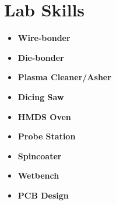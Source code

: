 \documentclass[]{chandan-cv}
\begin{document}
\begin{minipage}[t]{0.23\textwidth}

\section{Lab Skills}
	\begin{itemize}
		\setlength\itemsep{-0.2em}
		\item \textbf{Wire-bonder}
		\item \textbf{Die-bonder}
		\item \textbf{Plasma Cleaner/Asher}
		\item \textbf{Dicing Saw}
		\item \textbf{HMDS Oven}
		\item \textbf{Probe Station}
		\item \textbf{Spincoater}
		\item \textbf{Wetbench}
		\item \textbf{PCB Design}
	\end{itemize}

\sectionsep


%
%

\end{minipage}
\hfill
\end{document}
